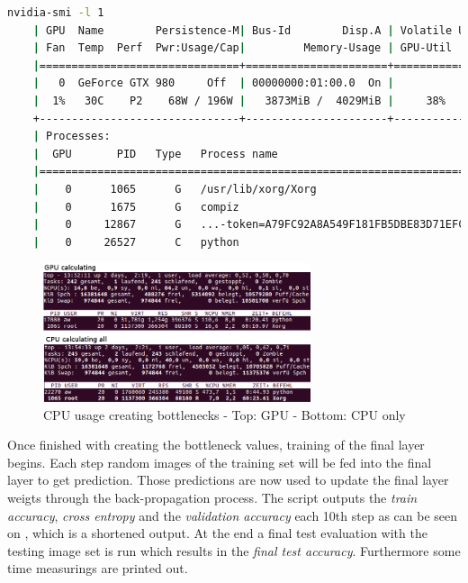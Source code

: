 \begin{minipage}{\linewidth}
\begin{lstlisting}[caption=Build and call of \textit{retrain}, label=list:bottleneck_gpu, language=bash]
	nvidia-smi -l 1
	| GPU  Name        Persistence-M| Bus-Id        Disp.A | Volatile Uncorr. ECC |
	| Fan  Temp  Perf  Pwr:Usage/Cap|         Memory-Usage | GPU-Util  Compute M. |
	|===============================+======================+======================|
	|   0  GeForce GTX 980     Off  | 00000000:01:00.0  On |                  N/A |
	|  1%   30C    P2    68W / 196W |   3873MiB /  4029MiB |     38%      Default |
	+-------------------------------+----------------------+----------------------+
	| Processes:                                                       GPU Memory |
	|  GPU       PID   Type   Process name                             Usage      |
	|=============================================================================|
	|    0      1065      G   /usr/lib/xorg/Xorg                           584MiB |
	|    0      1675      G   compiz                                        83MiB |
	|    0     12867      G   ...-token=A79FC92A8A549F181FB5DBE83D71EFC2    31MiB |
	|    0     26527      C   python                                      3159MiB |
\end{lstlisting}
\end{minipage}

\begin{figure}[htbp]
\centering
\includegraphics[width=0.7\textwidth]{includes/bottlenecksCPUUsage}
\caption[CPU usage creating bottlenecks]{CPU usage creating bottlenecks - Top: GPU - Bottom: CPU only}
\label{fig:bottlenecksCPUUsage}
\end{figure}

Once finished with creating the bottleneck values, training of the final layer begins. Each step random images of the training set will be fed into the final layer to get prediction. Those predictions are now used to update the final layer weigts through the back-propagation process. The script outputs the \textit{train accuracy}, \textit{cross entropy} and the \textit{validation accuracy} each 10th step as can be seen on , which is a shortened output. At the end a final test evaluation with the testing image set is run which results in the \textit{final test accuracy}. Furthermore some time measurings are printed out. \citep{TensorFlowRetrain2017}

